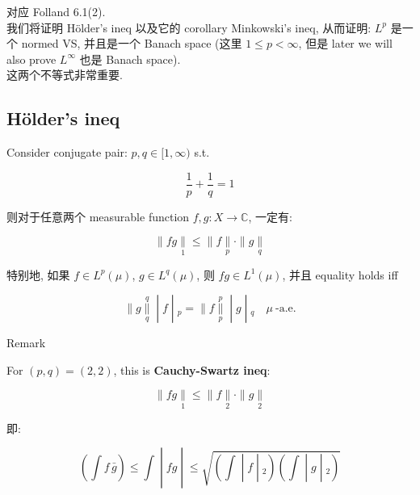 对应 Folland 6.1(2).\\
我们将证明 Hölder's ineq 以及它的 corollary Minkowski's ineq, 从而证明: \(L^{p}\) 是一个 normed VS, 并且是一个 Banach space (这里 \(1 \leq p < \infty\), 但是 later we will also prove \(L^{\infty}\) 也是 Banach space).\\
这两个不等式非常重要.

\subsection{Hölder's ineq}\label{huxf6lders-ineq}

\begin{theorem}{}

Consider conjugate pair: \(p,q \in \lbrack 1,\infty)\) s.t.

\[\frac{1}{p} + \frac{1}{q} = 1\]

则对于任意两个 measurable function \(f,g:X\rightarrow\mathbb{C}\), 一定有:

\[\parallel fg\underset{1}{\parallel} \leq \parallel f\underset{p}{\parallel} \cdot \parallel g\underset{q}{\parallel}\]

特别地, 如果 \(f \in L^{p}(\mu)\), \(g \in L^{q}(\mu)\), 则 \(fg \in L^{1}(\mu)\), 并且 equality holds iff

\[\left. \parallel g\underset{q}{\overset{q}{\parallel}} \middle| f \middle| {}_{p} = \parallel f\underset{p}{\overset{p}{\parallel}} \middle| g \middle| {}_{q}\quad\mu\ \text{-a.e.} \right.\]

\end{theorem}

\begin{qlremark}{Remark}

For \((p,q) = (2,2)\), this is \textbf{Cauchy-Swartz ineq}:

\[\parallel fg\underset{1}{\parallel} \leq \parallel f\underset{2}{\parallel} \cdot \parallel g\underset{2}{\parallel}\]

即:

\[\left. (\int f\,\bar{g}) \leq \int \middle| fg \middle| \leq \sqrt{\left. (\int \middle| f \middle| {}_{2})(\int \middle| g \middle| {}_{2}) \right.} \right.\]

\end{qlremark}


